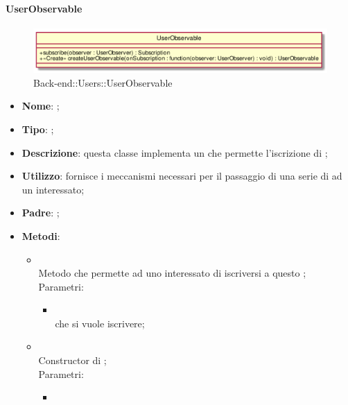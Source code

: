 \hypertarget{UserObservable_label}{\paragraph{UserObservable}}
\begin{figure}[h]
	\centering
	\includegraphics[width=\textwidth,height=\textheight,keepaspectratio]{images/ClassUserObservable.png}
	\caption{Back-end::Users::UserObservable}
\end{figure}
\begin{itemize}
	\item \textbf{Nome}: ;
	\item \textbf{Tipo}: ;
	\item \textbf{Descrizione}: questa classe implementa un  che permette l'iscrizione di ;
	\item \textbf{Utilizzo}: fornisce i meccanismi necessari per il passaggio di una serie di  ad un  interessato;
	\item \textbf{Padre}: ;
	\item \textbf{Metodi}:
	\begin{itemize}
		\item[]  \\
		Metodo che permette ad uno  interessato di iscriversi a questo ;\\
		Parametri:
		\begin{itemize}
			\item {} \\
			 che si vuole iscrivere;
		\end{itemize}
		\item[]  \\
		Constructor di ;\\
		Parametri:
		\begin{itemize}
			\item {} \\

\end{itemize}
\end{itemize}
\end{itemize}
